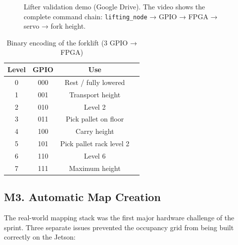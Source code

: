 \documentclass[conference]{IEEEtran}
\begin{document}
\begin{figure}[htbp]
  \centering
  \caption{Lifter validation demo (Google Drive). The video shows the complete
           command chain: \texttt{lifting\_node} → GPIO → FPGA → servo →
           fork height.}
  \label{fig:lifter_demo}
\end{figure}

\begin{table}[h]
\caption{Binary encoding of the forklift (3 GPIO → FPGA)}
\label{tab:lifter_encoding}
\renewcommand{\arraystretch}{1.2}
\centering
\begin{tabular}{ccc>{\raggedright\arraybackslash}p{3.5cm}}
\toprule
\textbf{Level} & \textbf{GPIO} & \textbf{Use} \\
\midrule
0 & 000 & Rest / fully lowered \\
1 & 001 & Transport height \\
2 & 010 & Level 2 \\
3 & 011 & Pick pallet on floor \\
4 & 100 & Carry height \\
5 & 101 & Pick pallet rack level 2 \\
6 & 110 & Level 6 \\
7 & 111 & Maximum height \\
\bottomrule
\end{tabular}
\end{table}

\subsection{M3. Automatic Map Creation}

The real-world mapping stack was the first major hardware challenge of the
sprint. Three separate issues prevented the occupancy grid from being built
correctly on the Jetson:
\end{document}
